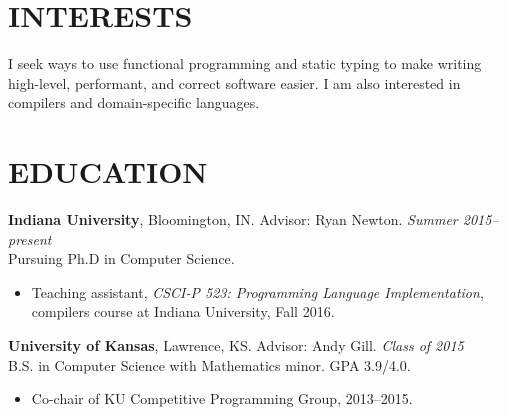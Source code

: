 \documentclass{res}
\begin{document}
\address{\texttt{rgscott@indiana.edu} $\bullet$ \texttt{ryanglscott.github.io}}

\begin{resume}

\section{INTERESTS}
    I seek ways to use functional programming and static typing to make writing high-level, performant, and correct software easier. I am also interested in compilers and domain-specific languages.

\section{EDUCATION}
     \textbf{Indiana University}, Bloomington, IN. Advisor: Ryan Newton. \hfill \textit{Summer 2015--present} \\
    Pursuing Ph.D in Computer Science.
    \begin{itemize}
     \item Teaching assistant, \textit{CSCI-P 523: Programming Language Implementation}, compilers course at Indiana University, Fall 2016.
    \end{itemize}

     \textbf{University of Kansas}, Lawrence, KS. Advisor: Andy Gill. \hfill \textit{Class of 2015} \\
    B.S. in Computer Science with Mathematics minor. GPA 3.9/4.0.
    \begin{itemize}
     \item Co-chair of KU Competitive Programming Group, 2013--2015.
    \end{itemize}


\end{resume}
\end{document}
